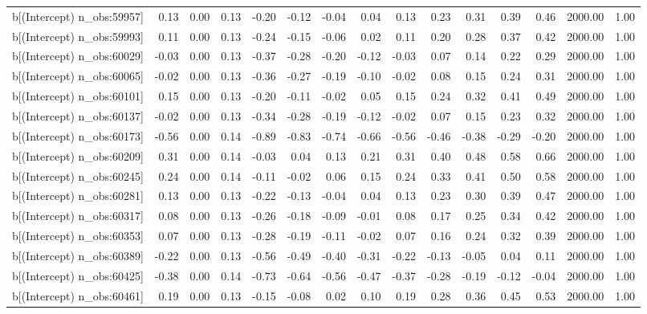 \begin{table}[ht]
\begin{tabular}{rrrrrrrrrrrrrrr}
  b[(Intercept) n\_obs:59957] & 0.13 & 0.00 & 0.13 & -0.20 & -0.12 & -0.04 & 0.04 & 0.13 & 0.23 & 0.31 & 0.39 & 0.46 & 2000.00 & 1.00 \\ 
  b[(Intercept) n\_obs:59993] & 0.11 & 0.00 & 0.13 & -0.24 & -0.15 & -0.06 & 0.02 & 0.11 & 0.20 & 0.28 & 0.37 & 0.42 & 2000.00 & 1.00 \\ 
  b[(Intercept) n\_obs:60029] & -0.03 & 0.00 & 0.13 & -0.37 & -0.28 & -0.20 & -0.12 & -0.03 & 0.07 & 0.14 & 0.22 & 0.29 & 2000.00 & 1.00 \\ 
  b[(Intercept) n\_obs:60065] & -0.02 & 0.00 & 0.13 & -0.36 & -0.27 & -0.19 & -0.10 & -0.02 & 0.08 & 0.15 & 0.24 & 0.31 & 2000.00 & 1.00 \\ 
  b[(Intercept) n\_obs:60101] & 0.15 & 0.00 & 0.13 & -0.20 & -0.11 & -0.02 & 0.05 & 0.15 & 0.24 & 0.32 & 0.41 & 0.49 & 2000.00 & 1.00 \\ 
  b[(Intercept) n\_obs:60137] & -0.02 & 0.00 & 0.13 & -0.34 & -0.28 & -0.19 & -0.12 & -0.02 & 0.07 & 0.15 & 0.23 & 0.32 & 2000.00 & 1.00 \\ 
  b[(Intercept) n\_obs:60173] & -0.56 & 0.00 & 0.14 & -0.89 & -0.83 & -0.74 & -0.66 & -0.56 & -0.46 & -0.38 & -0.29 & -0.20 & 2000.00 & 1.00 \\ 
  b[(Intercept) n\_obs:60209] & 0.31 & 0.00 & 0.14 & -0.03 & 0.04 & 0.13 & 0.21 & 0.31 & 0.40 & 0.48 & 0.58 & 0.66 & 2000.00 & 1.00 \\ 
  b[(Intercept) n\_obs:60245] & 0.24 & 0.00 & 0.14 & -0.11 & -0.02 & 0.06 & 0.15 & 0.24 & 0.33 & 0.41 & 0.50 & 0.58 & 2000.00 & 1.00 \\ 
  b[(Intercept) n\_obs:60281] & 0.13 & 0.00 & 0.13 & -0.22 & -0.13 & -0.04 & 0.04 & 0.13 & 0.23 & 0.30 & 0.39 & 0.47 & 2000.00 & 1.00 \\ 
  b[(Intercept) n\_obs:60317] & 0.08 & 0.00 & 0.13 & -0.26 & -0.18 & -0.09 & -0.01 & 0.08 & 0.17 & 0.25 & 0.34 & 0.42 & 2000.00 & 1.00 \\ 
  b[(Intercept) n\_obs:60353] & 0.07 & 0.00 & 0.13 & -0.28 & -0.19 & -0.11 & -0.02 & 0.07 & 0.16 & 0.24 & 0.32 & 0.39 & 2000.00 & 1.00 \\ 
  b[(Intercept) n\_obs:60389] & -0.22 & 0.00 & 0.13 & -0.56 & -0.49 & -0.40 & -0.31 & -0.22 & -0.13 & -0.05 & 0.04 & 0.11 & 2000.00 & 1.00 \\ 
  b[(Intercept) n\_obs:60425] & -0.38 & 0.00 & 0.14 & -0.73 & -0.64 & -0.56 & -0.47 & -0.37 & -0.28 & -0.19 & -0.12 & -0.04 & 2000.00 & 1.00 \\ 
  b[(Intercept) n\_obs:60461] & 0.19 & 0.00 & 0.13 & -0.15 & -0.08 & 0.02 & 0.10 & 0.19 & 0.28 & 0.36 & 0.45 & 0.53 & 2000.00 & 1.00 \\ 

\end{tabular}
\end{table}

